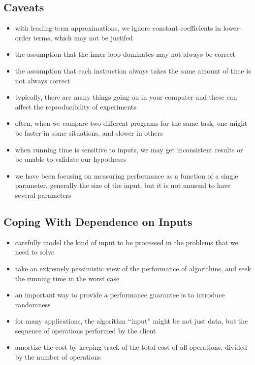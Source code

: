 \documentclass[8pt,a4paper,compress]{beamer}
\begin{document}
\subsection*{Caveats}
\begin{frame}[fragile]
\begin{itemize}
\item with leading-term approximations, we ignore constant coefficients in lower-order terms, which may not be justifed

\item the assumption that the inner loop dominates may not always be correct 

\item the assumption that each instruction always takes the same amount of time is not always correct

\item typically, there are many things going on in your computer and these can affect the reproducibility of experiments

\item often, when we compare two different programs for the same task, one might be faster in some situations, and slower in others

\item when running time is sensitive to inputs, we may get inconsistent results or be unable to validate our hypotheses

\item we have been focusing on measuring performance as a function of a single parameter, generally the size of the input, but it is not unusual to have several parameters
\end{itemize}
\end{frame}

\subsection*{Coping With Dependence on Inputs}
\begin{frame}[fragile]
\begin{itemize}
\item carefully model the kind of input to be processed in the problems that we need to solve

\item take an extremely pessimistic view of the performance of algorithms, and seek the running time in the worst case

\item an important way to provide a performance guarantee is to introduce randomness

\item for many applications, the algorithm ``input'' might be not just data, but the sequence of operations performed by the client

\item amortize the cost by keeping track of the total cost of all operations, divided by the number of operations
\end{itemize}
\end{frame}
\end{document}

